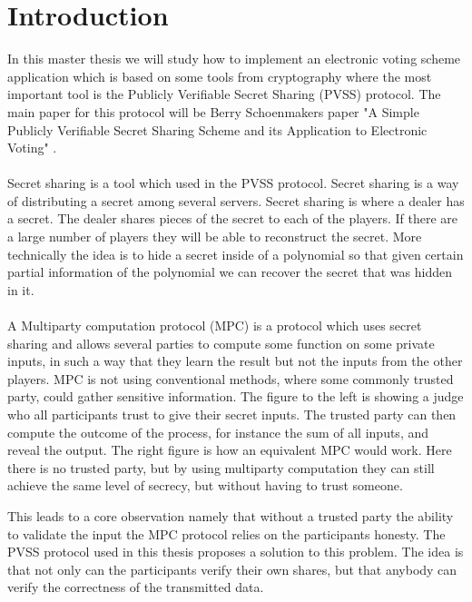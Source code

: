 \section{Introduction}
In this master thesis we will study how to implement an  electronic voting scheme application which is based on some tools from cryptography where the most important tool is the Publicly Verifiable Secret Sharing (PVSS) protocol. The main paper for this protocol will be Berry Schoenmakers paper "A Simple Publicly Verifiable Secret Sharing Scheme and its Application to Electronic Voting" \cite{Schoenmakers1999}. \\\\
\noindent
Secret sharing is a tool which used in the PVSS protocol. Secret sharing is a way of distributing a secret among several servers. Secret sharing is where a dealer has a secret. The dealer shares pieces of the secret to each of the players. If there are a large number of players they will be able to reconstruct the secret. More technically the idea is to hide a secret inside of a polynomial so that given certain partial information of the polynomial we can recover the secret that was hidden in it.\\\\
\noindent
A Multiparty computation protocol (MPC) is a protocol which uses secret sharing and allows several parties to compute some function on some private inputs, in such a way that they learn the result but not the inputs from the other players. MPC is not using conventional methods, where some commonly trusted party, could gather sensitive information. The figure to the left is showing a judge who all participants trust to give their secret inputs. The trusted party can then compute the outcome of the process, for instance the sum of all inputs, and reveal the output. The right figure is how an equivalent MPC would work. Here there is no trusted party, but by using multiparty computation they can still achieve the same level of secrecy, but without having to trust someone.
 
\begin{center}
\end{center}

\noindent
This leads to a core observation namely that without a trusted party the ability to validate the input the MPC protocol relies on the participants honesty. 
The PVSS protocol used in this thesis proposes a solution to this problem. The idea is that not only can the participants verify their own shares, but that anybody can verify the correctness of the transmitted data.